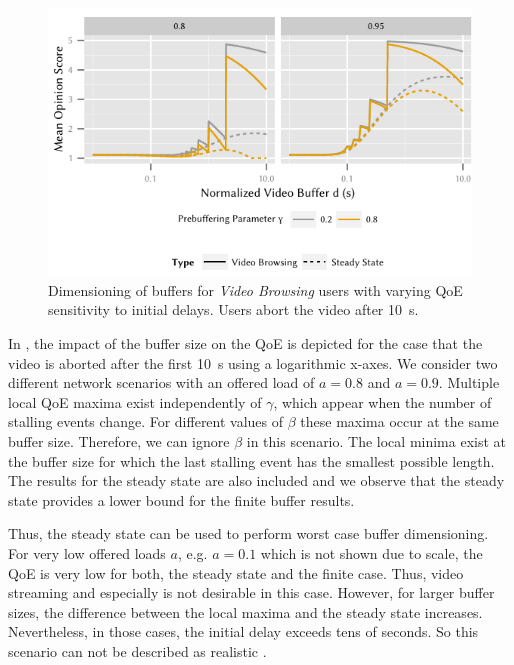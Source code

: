 \begin{figure}
  \centering
  \includegraphics{application/qoe_user_behaviour/user_scenarios/figures/video_browsing}
  \caption{Dimensioning of buffers for \emph{Video Browsing} users with varying \gls{QoE} sensitivity to initial delays. Users abort the video after \SI{10}{\second}.}
  \label{fig:application:qoe_user_behaviour:typical_user_scenarios:browsing:video_browsing}
\end{figure}

In , the impact of the buffer size on the \gls{QoE} is depicted for the case that the video is aborted after the first \SI{10}{\second} using a logarithmic x-axes. 
We consider two different network scenarios with an offered load of \(a = 0.8\) and \(a = 0.9\).
Multiple local QoE maxima exist independently of \(\gamma\), which appear when the number of stalling events change. 
For different values of \(\beta\) these maxima occur at the same buffer size.
Therefore, we can ignore \(\beta\) in this scenario. 
The local minima exist at the buffer size for which the last stalling event has the smallest possible length. 
The results for the steady state are also included and we observe that the steady state provides a lower bound for the finite buffer results.

Thus, the steady state can be used to perform worst case buffer dimensioning.
For very low offered loads \(a\), e.g. \(a = 0.1\) which is not shown due to scale, the \gls{QoE} is very low for both, the steady state and the finite case. 
Thus, video streaming and especially \videoBrowsing is not desirable in this case. 
However, for larger buffer sizes, the difference between the local maxima and the steady state increases. 
Nevertheless, in those cases, the initial delay exceeds tens of seconds.
So this scenario can not be described as realistic \videoBrowsing.


